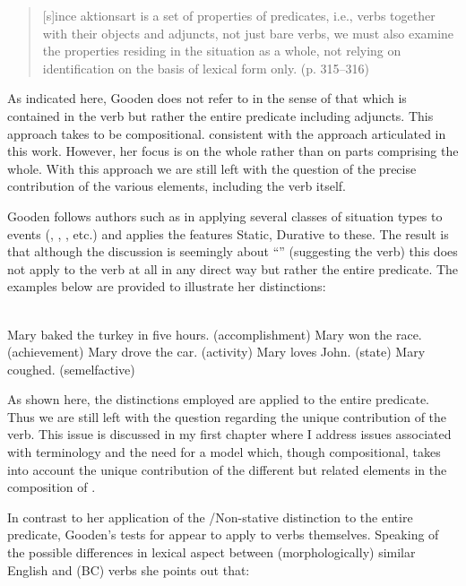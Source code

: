 \begin{quote}
[s]ince aktionsart is a set of properties of predicates, i.e., verbs
together with their objects and adjuncts, not just bare verbs, we must
also examine the properties residing in the situation as a whole, not
relying on identification on the basis of lexical form
only. (p. 315--316)
\end{quote}

As indicated here, Gooden does not refer to  in the
sense of that which is contained in the verb but rather the entire
predicate including adjuncts.  This approach takes  to be
compositional. consistent with the approach articulated in this work.
However, her focus is on the whole rather than on parts comprising the
whole.  With this approach we are still left with the question of the
precise contribution of the various elements, including the verb
itself.

Gooden follows authors such as \citet{Dowty1979} in applying several
classes of situation types to events (, ,
,  etc.) and applies the features Static, Durative 
to these.  The result is that although the discussion is seemingly
about ``” (suggesting the verb) this does not apply to
the verb at all in any direct way but rather the entire predicate.
The examples below are provided to illustrate her distinctions:

\ea%
\label{ex:2:23}
\citet[316]{Gooden2008}\\
\ea Mary baked the turkey in five hours. (accomplishment) \ex Mary won
the race. (achievement) \ex Mary drove the car. (activity) \ex Mary
loves John. (state) \ex Mary coughed. (semelfactive) \z \z

As shown here, the distinctions employed are applied to the entire
predicate.  Thus we are still left with the question regarding the
unique contribution of the verb.  This issue is discussed in my first
chapter where I address issues associated with terminology and the
need for a model which, though compositional, takes into account the
unique contribution of the different but related elements in the
composition of .

In contrast to her application of the \slash Non-stative distinction
to the entire predicate, Gooden’s tests for  appear to apply
to verbs themselves.  Speaking of the possible differences in lexical
aspect between (morphologically) similar English and  (BC) verbs she
points out that:

